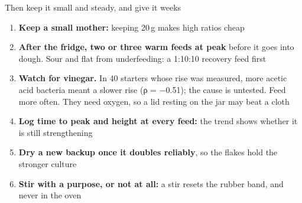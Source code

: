 \documentclass[aspectratio=169,11pt]{beamer}
\begin{document}
\begin{frame}{Then keep it small and steady, and give it weeks}
  \small
  \begin{enumerate}\setlength{\itemsep}{2pt}
    \setcounter{enumi}{5}
    \item \textbf{Keep a small mother:} keeping 20\,g makes high ratios cheap
    \item \textbf{After the fridge, two or three warm feeds at peak} before it goes into dough. Sour and flat from underfeeding: a 1:10:10 recovery feed first
    \item \textbf{Watch for vinegar.} In 40 starters whose rise was measured, more acetic acid bacteria meant a slower rise (ρ = −0.51); the cause is untested. Feed more often. They need oxygen, so a lid resting on the jar may beat a cloth \untested
    \item \textbf{Log time to peak and height at every feed:} the trend shows whether it is still strengthening
    \item \textbf{Dry a new backup once it doubles reliably}, so the flakes hold the stronger culture
    \item \textbf{Stir with a purpose, or not at all:} a stir resets the rubber band, and never in the oven
  \end{enumerate}
\end{frame}
\end{document}
